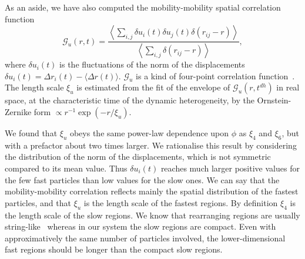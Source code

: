 \documentclass[prl,twocolumn,notitlepage]{revtex4-1}
\begin{document}
As an aside, we have also computed the mobility-mobility spatial correlation function~\cite{Donati1999}
\begin{equation}
	\mathcal{G}_u(r,t) = \frac{
		\left\langle \sum_{i,j}{\delta u_i(t) \delta u_j(t) \delta(r_{ij} -r)} \right\rangle 
	}{
		\left\langle \sum_{i,j}{\delta(r_{ij} -r)} \right\rangle
	},
	\label{eq:mobility_correl}
\end{equation}
where $\delta u_i(t)$ is the fluctuations of the norm of the displacements $\delta u_i(t) = \Delta r_i(t)-\langle\Delta r(t)\rangle$. $\mathcal{G}_u$ is a kind of four-point correlation function~\cite{cavagna2009supercooled}. The length scale $\xi_u$ is estimated from the fit of the envelope of $\mathcal{G}_u(r,t^{dh})$ in real space, at the characteristic time of the dynamic heterogeneity, by the Ornstein-Zernike form $\propto r^{-1}\exp( -r/\xi_u)$. 

We found that $\xi_u$ obeys the same power-law dependence upon $\phi$ as $\xi_4$ and $\xi_6$, but with a prefactor about two times larger. We rationalise this result by considering the distribution of the norm of the displacements, which is not symmetric compared to its mean value. Thus $\delta u_i(t)$ reaches much larger positive values for the few fast particles than low values for the slow ones. We can say that the mobility-mobility correlation reflects mainly the spatial distribution of the fastest particles, and that $\xi_u$ is the length scale of the fastest regions. By definition $\xi_4$ is the length scale of the slow regions. We know that rearranging regions are usually string-like~\cite{Donati1999} whereas in our system the slow regions are compact. Even with approximatively the same number of particles involved, the lower-dimensional fast regions should be longer than the compact slow regions.



%

\end{document}
